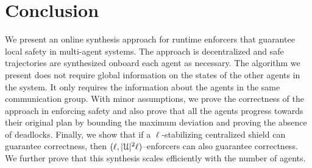 \section{Conclusion}

We present an online synthesis approach for runtime enforcers that guarantee local safety in multi-agent systems. The approach is decentralized and safe trajectories are synthesized onboard each agent as necessary. The algorithm we present does not require global information on the states of the other agents in the system. It only requires the information about the agents in the same communication group. With minor assumptions, we prove the correctness of the approach in enforcing safety and also prove that all the agents progress towards their original plan by bounding the maximum deviation and proving the absence of deadlocks. Finally, we show that if a $\ell$-stabilizing centralized shield can guarantee correctness, then $(\ell,|\mathcal{U}|^2 \ell)$--enforcers can also guarantee correctness.  We further prove that this synthesis scales efficiently with the number of agents. 

